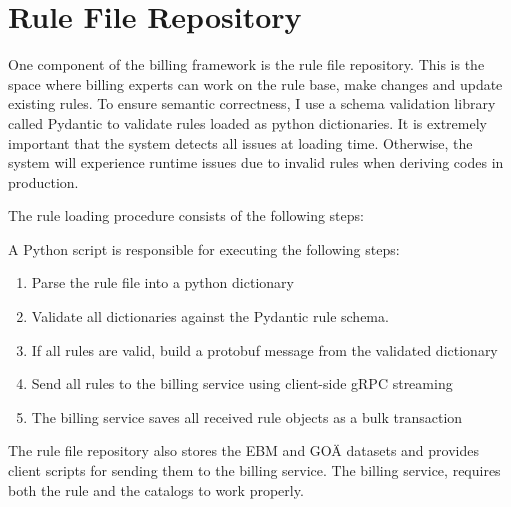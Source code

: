 \section{Rule File Repository}\label{sec:rule-file-repository}
One component of the billing framework is the rule file repository.
This is the space where billing experts can work on the rule base, make changes and update existing rules.
To ensure semantic correctness, I use a schema validation library called Pydantic to validate rules loaded as python dictionaries.
It is extremely important that the system detects all issues at loading time.
Otherwise, the system will experience runtime issues due to invalid rules when deriving codes in production.

The rule loading procedure consists of the following steps:

A Python script is responsible for executing the following steps:
\begin{enumerate}
    \item Parse the rule file into a python dictionary
    \item Validate all dictionaries against the Pydantic rule schema.
    \item If all rules are valid, build a  protobuf message from the validated dictionary
    \item Send all rules to the billing service using client-side gRPC streaming
    \item The billing service saves all received rule objects as a bulk transaction
\end{enumerate}

The rule file repository also stores the EBM and GOÄ datasets and provides client scripts for sending them to the billing service.
The billing service, requires both the rule and the catalogs to work properly.
